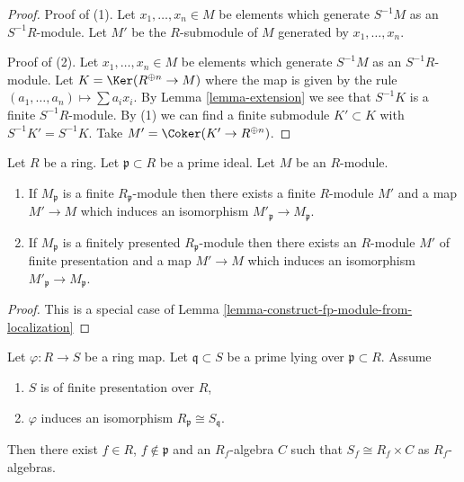\begin{proof}
Proof of (1). Let $x_1, \ldots, x_n \in M$ be elements which generate
$S^{-1}M$ as an $S^{-1}R$-module. Let $M'$ be the
$R$-submodule of $M$ generated by $x_1, \ldots, x_n$.

\medskip\noindent
Proof of (2). Let $x_1, \ldots, x_n \in M$ be elements which generate
$S^{-1}M$ as an $S^{-1}R$-module. Let
$K = \Ker(R^{\oplus n} \to M)$ where the map is given by
the rule $(a_1, \ldots, a_n) \mapsto \sum a_i x_i$. By
Lemma \ref{lemma-extension}
we see that $S^{-1}K$ is a finite $S^{-1}R$-module.
By (1) we can find a finite submodule $K' \subset K$
with $S^{-1}K' = S^{-1}K$. Take
$M' = \Coker(K' \to R^{\oplus n})$.
\end{proof}

\begin{lemma}
\label{lemma-construct-fp-module-from-stalk}
Let $R$ be a ring.
Let $\mathfrak p \subset R$ be a prime ideal.
Let $M$ be an $R$-module.
\begin{enumerate}
\item If $M_{\mathfrak p}$ is a finite $R_{\mathfrak p}$-module then there
exists a finite $R$-module $M'$ and a map $M' \to M$ which induces an
isomorphism $M'_{\mathfrak p} \to M_{\mathfrak p}$.
\item If $M_{\mathfrak p}$ is a finitely presented $R_{\mathfrak p}$-module
then there exists an $R$-module $M'$ of finite presentation
and a map $M' \to M$ which induces an isomorphism
$M'_{\mathfrak p} \to M_{\mathfrak p}$.
\end{enumerate}
\end{lemma}

\begin{proof}
This is a special case of
Lemma \ref{lemma-construct-fp-module-from-localization}
\end{proof}

\begin{lemma}
\label{lemma-local-isomorphism}
Let $\varphi : R \to S$ be a ring map. Let $\mathfrak q \subset S$
be a prime lying over $\mathfrak p \subset R$. Assume
\begin{enumerate}
\item $S$ is of finite presentation over $R$,
\item $\varphi$ induces an isomorphism $R_\mathfrak p \cong S_\mathfrak q$.
\end{enumerate}
Then there exist $f \in R$, $f \not \in \mathfrak p$ and an
$R_f$-algebra $C$ such that $S_f \cong R_f \times C$ as $R_f$-algebras.
\end{lemma}

